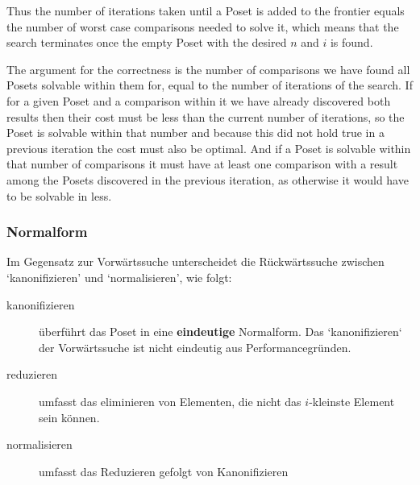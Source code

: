 \documentclass[10pt,journal,compsoc]{IEEEtran}
\begin{document}
Thus the number of iterations taken until a Poset is added to the frontier equals the number of
worst case comparisons needed to solve it, which means that the search terminates once the empty
Poset with the desired $n$ and $i$ is found.

The argument for the correctness is the number of comparisons we have found all Posets solvable
within them for, equal to the number of iterations of the search. If for a given Poset and a
comparison within it we have already discovered both results then their cost must be less than the
current number of iterations, so the Poset is solvable within that number and because this did not
hold true in a previous iteration the cost must also be optimal. And if a Poset is solvable within
that number of comparisons it must have at least one comparison with a result among the Posets
discovered in the previous iteration, as otherwise it would have to be solvable in less.


\subsubsection{Normalform}
Im Gegensatz zur Vorwärtssuche unterscheidet die Rückwärtssuche zwischen `kanonifizieren' und `normalisieren', wie folgt:
\begin{description}
  \item[kanonifizieren]
    überführt das Poset in eine \textbf{eindeutige} Normalform.
    Das `kanonifizieren` der Vorwärtssuche ist nicht eindeutig aus Performancegründen.
  \item[reduzieren]
    umfasst das eliminieren von Elementen, die nicht das $i$-kleinste Element sein können.
  \item[normalisieren]
    umfasst das Reduzieren gefolgt von Kanonifizieren
\end{description}
\end{document}
